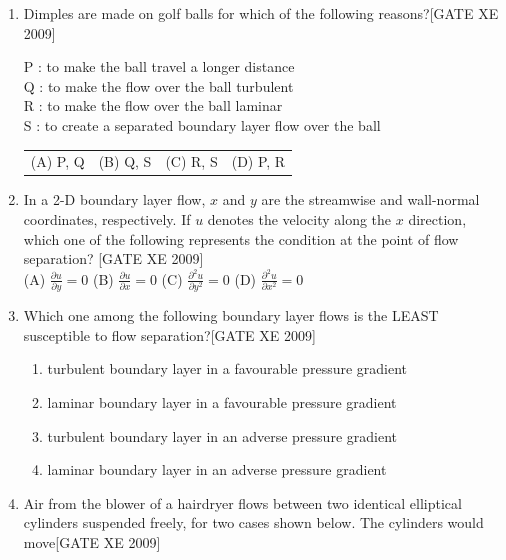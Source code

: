 \documentclass[journal,12pt,onecolumn]{IEEEtran}
\theoremstyle{remark}
\begin{document}
\begin{enumerate}
 \item[Q.5] Dimples are made on golf balls for which of the following reasons?\hfill[GATE XE 2009]

\vspace{1em}

\noindent
P : to make the ball travel a longer distance \\
Q : to make the flow over the ball turbulent \\
R : to make the flow over the ball laminar \\
S : to create a separated boundary layer flow over the ball

\vspace{1em}

\noindent
\begin{tabular}{llll}
(A) P, Q & (B) Q, S & (C) R, S & (D) P, R \\
\end{tabular}

\item [Q.6]In a 2-D boundary layer flow, $x$ and $y$ are the streamwise and wall-normal coordinates, respectively. If $u$ denotes the velocity along the $x$ direction, which one of the following represents the condition at the point of flow separation?
\hfill[GATE XE 2009]\\
    (A) $\frac{\partial u}{\partial y} = 0$\hfill
    (B) $\frac{\partial u}{\partial x} = 0$\hfill
   (C) $\frac{\partial^2 u}{\partial y^2} = 0$\hfill
    (D) $\frac{\partial^2 u}{\partial x^2} = 0$


\item[Q.7] Which one among the following boundary layer flows is the LEAST susceptible to flow separation?\hfill[GATE XE 2009]
\begin{enumerate}
    \item[(A)] turbulent boundary layer in a favourable pressure gradient
    \item[(B)] laminar boundary layer in a favourable pressure gradient
    \item[(C)] turbulent boundary layer in an adverse pressure gradient
    \item[(D)] laminar boundary layer in an adverse pressure gradient
\end{enumerate}

\item[Q.8] Air from the blower of a hairdryer flows between two identical elliptical cylinders suspended freely, for two cases shown below. The cylinders would move\hfill[GATE XE 2009]


\end{enumerate}
\end{document}
